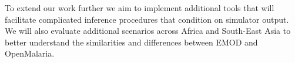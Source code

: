 \documentclass{article}
\begin{document}
To extend our work further we aim to implement additional 
tools that will facilitate complicated inference procedures that condition on simulator 
output. We will also evaluate additional scenarios across Africa and South-East Asia to better understand the similarities and differences between EMOD and OpenMalaria.







\end{document}
